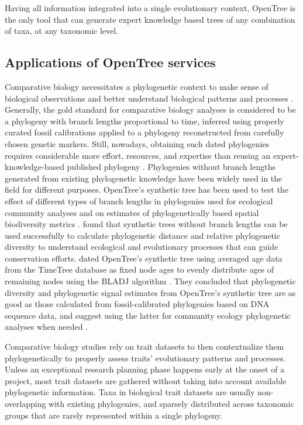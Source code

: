 \documentclass[oupdraft]{sysbio_sse}
\begin{document}
Having all information integrated into a single evolutionary context, OpenTree is the only tool that can generate expert knowledge based trees of any combination of taxa, at any taxonomic level.


\subsection{Applications of OpenTree services}

Comparative biology necessitates a phylogenetic context to make sense of biological
observations and better understand biological patterns and processes
\citep{felsenstein1985phylogenies, soltis2003role}.
Generally, the gold standard for comparative biology analyses is considered to be a phylogeny with branch lengths
proportional to time, inferred using properly curated fossil calibrations applied
to a phylogeny reconstructed from carefully chosen genetic markers.
Still, nowadays, obtaining such dated phylogenies requires
considerable more effort, resources, and expertise than reusing an expert-knowledge-based
published phylogeny \citep{li2019common}.
Phylogenies without branch lengths generated from existing phylogenetic knowledge
have been widely used in the field for different purposes.
OpenTree's synthetic tree has been used to test the effect of different types
of branch lengths in phylogenies used for ecological community analyses and on estimates of
phylogenetically based spatial biodiversity metrics \citep{allen2019spatial, li2019common}.
\citep{allen2019spatial} found that synthetic trees without branch lengths can be used successfully
to calculate phylogenetic distance and relative phylogenetic diversity to understand
ecological and evolutionary processes that can guide conservation efforts.
\citep{li2019common} dated OpenTree's synthetic tree using averaged age data from
the TimeTree database \citep{} as fixed node ages to evenly distribute ages of remaining
nodes using the BLADJ algorithm \citep{}. They concluded that phylogenetic diversity
and phylogenetic signal estimates from OpenTree's synthetic tree are as good
as those calculated from fossil-calibrated phylogenies based on DNA sequence data,
and suggest using the latter for community ecology phylogenetic analyses when needed \citep{li2019common}.

Comparative biology studies rely on trait datasets to then contextualize them phylogenetically
to properly assess traits' evolutionary patterns and processes.
Unless an exceptional research planning phase happens early at the onset of a project,
most trait datasets are gathered without taking into account available phylogenetic information.
Taxa in biological trait datasets are usually non-overlapping with existing phylogenies,
and sparsely distributed across taxonomic groups that are rarely represented within
a single phylogeny.
\end{document}
